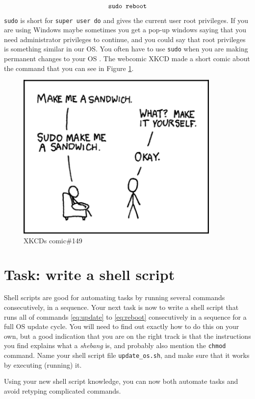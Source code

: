 \documentclass{article}
\newcommand{\figref}[1]{Figure \ref{fig:#1}}
\begin{document}
\begin{equation}
\label{eq:reboot}
\verb!sudo reboot!
\end{equation}
\verb!sudo! is short for \verb!super user do! and gives the current user root privileges. If you are using Windows maybe sometimes you get a pop-up windows saying that you need administrator privileges to continue, and you could say that root privileges is something similar in our OS. You often have to use \verb!sudo! when you are making permanent changes to your OS \cite{sudo}. The webcomic XKCD made a short comic \cite{xkcd} about the command that you can see in \figref{xkcd}.
\begin{figure}[ht]
    \centering
    \includegraphics[width=100mm]{sandwich.png}
    \caption{XKCDs comic\#149}
    \label{fig:xkcd}
\end{figure}

\section{Task: write a shell script}
\noindent Shell scripts are good for automating tasks by running several commands consecutively, in a sequence. Your next task is now to write a shell script that runs all of commands \eqref{eq:update} to \eqref{eq:reboot} consecutively in a sequence for a full OS update cycle. You will need to find out exactly how to do this on your own, but a good indication that you are on the right track is that the instructions you find explains what a \textit{shebang} is, and probably also mention the \verb!chmod! command. Name your shell script file \verb!update_os.sh!, and make sure that it works by executing (running) it.

Using your new shell script knowledge, you can now both automate tasks and avoid retyping complicated commands.
\end{document}
